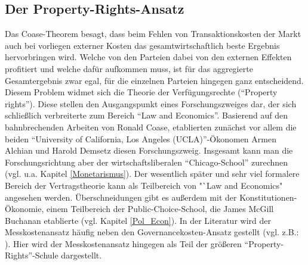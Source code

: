 \subsection{Der Property-Rights-Ansatz}
\label{sec: Property Rights}

Das Coase-Theorem besagt, dass beim Fehlen von Transaktionskosten der Markt auch bei vorliegen externer Kosten das gesamtwirtschaftlich beste Ergebnis hervorbringen wird. Welche von den Parteien dabei von den externen Effekten profitiert und welche dafür aufkommen muss, ist für das aggregierte Gesamtergebnis zwar egal, für die einzelnen Parteien hingegen ganz entscheidend. Diesem Problem widmet sich die Theorie der Verfügungsrechte ("`Property rights"'). Diese stellen den Ausgangspunkt eines Forschungszweiges dar, der sich schließlich verbreiterte zum Bereich "`Law and Economics"'. Basierend auf den bahnbrechenden Arbeiten von Ronald Coase, etablierten zunächst vor allem die beiden "`University of California, Los Angeles (UCLA)"'-Ökonomen Armen Alchian und Harold Demsetz diesen Forschungszweig. Insgesamt kann man die Forschungsrichtung aber der wirtschaftsliberalen "`Chicago-School"' zurechnen (vgl. u.a. Kapitel \ref{Monetarismus}). Der wesentlich später und sehr viel formalere Bereich der Vertragstheorie kann als Teilbereich von "`Law and Economics" angesehen werden. Überschneidungen gibt es außerdem mit der Konstitutionen-Ökonomie, einem Teilbereich der Public-Choice-School, die James McGill Buchanan etablierte (vgl. Kapitel \ref{Pol_Econ}). In der Literatur wird der Messkostenansatz häufig neben den Governancekosten-Ansatz gestellt (vgl. z.B.: \parencite[S. 40]{Erlei2016}). Hier wird der Messkostenansatz hingegen als Teil der größeren "`Property-Rights"'-Schule dargestellt.

